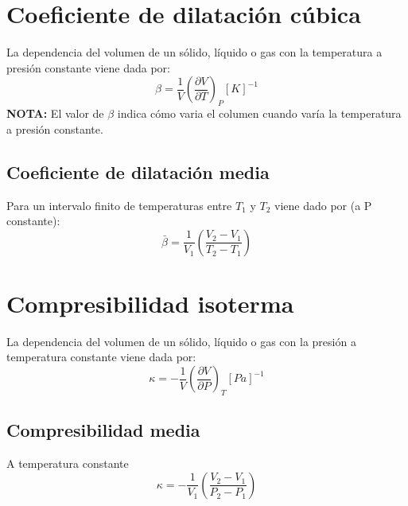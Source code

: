 \documentclass[12pt,twocolumn,a4paper]{report}
\begin{document}
\section*{Coeficiente de dilatación cúbica}
La dependencia del volumen de un sólido, líquido o gas con la temperatura a presión constante viene dada por: 
\begin{equation*}
\beta = \dfrac{1}{V}\left(\frac{\partial V}{\partial T}\right)_P [K]^{-1}
\end{equation*}
\textbf{NOTA:} El valor de $\beta$ indica cómo varia el columen cuando varía la temperatura a presión constante.
\vspace{5px}
\subsection*{Coeficiente de dilatación media}
Para un intervalo finito de temperaturas entre $T_1$ y $T_2$ viene dado por (a P constante): 
\begin{equation*}
\bar{\beta}=\dfrac{1}{V_1}\left(\frac{V_2 - V_1}{T_2 - T_1}\right)
\end{equation*}
\section*{Compresibilidad isoterma}
La dependencia del volumen de un sólido, líquido o gas con la presión  a temperatura constante viene dada por:  
\begin{equation*}
\kappa=-\dfrac{1}{V}\left(\frac{\partial V}{\partial P}\right)_T [Pa]^{-1}
\end{equation*}
\vspace{5px}
\subsection*{Compresibilidad media}
A temperatura constante
\begin{equation*}
\kappa=-\dfrac{1}{V_1}\left(\frac{V_2 - V_1}{P_2 - P_1}\right)
\end{equation*}
\end{document}
